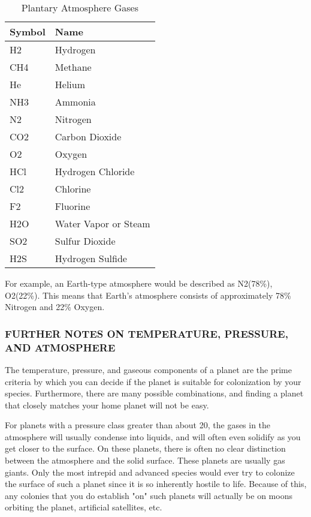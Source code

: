 \documentclass[10pt,titlepage]{article}
\begin{document}
\begin{table}[h]
\begin{center}
\begin{tabular}{|ll|}
\hline
\rowcolor{lightblue} \textbf{Symbol} & \textbf{Name} \\
\hline
		H2	&Hydrogen \\
		CH4	&Methane \\
		He	&Helium \\
		NH3	&Ammonia \\
		N2	&Nitrogen \\
		CO2	&Carbon Dioxide \\
		O2	&Oxygen \\
		HCl	&Hydrogen Chloride \\
		Cl2	&Chlorine \\
		F2	&Fluorine \\
		H2O	&Water Vapor or Steam \\
		SO2	&Sulfur Dioxide \\
		H2S	&Hydrogen Sulfide \\
\hline
\end{tabular}
\caption{Plantary Atmosphere Gases}
\label{tab:gas}
\end{center}
\end{table}

For example, an Earth-type atmosphere would be described as N2(78\%), O2(22\%).
This means that Earth's atmosphere consists of approximately 78\% Nitrogen and
22\% Oxygen.


\subsubsection{FURTHER NOTES ON TEMPERATURE, PRESSURE, AND ATMOSPHERE}

The temperature, pressure, and gaseous components of a planet are the prime
criteria by which you can decide if the planet is suitable for colonization by
your species.  Furthermore, there are many possible combinations, and finding
a planet that closely matches your home planet will not be easy.

For planets with a pressure class greater than about 20, the gases in the
atmosphere will usually condense into liquids, and will often even solidify as
you get closer to the surface.  On these planets, there is often no clear
distinction between the atmosphere and the solid surface.  These planets are
usually gas giants.  Only the most intrepid and advanced species would ever try
to colonize the surface of such a planet since it is so inherently hostile to
life.  Because of this, any colonies that you do establish "on" such planets
will actually be on moons orbiting the planet, artificial satellites, etc.
\end{document}
